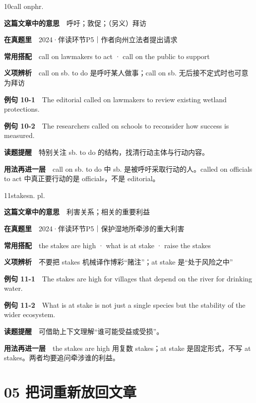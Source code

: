 \documentclass[a4paper,11pt,openany]{report}
\newcommand{\emphasislabel}[1]{\textcolor{leaf}{\CJKsf\bfseries #1}}
\begin{document}
\begin{vocabbox}{10}{call on}{phr.}

\textbf{这篇文章中的意思}　呼吁；敦促；（另义）拜访

\textbf{在真题里}　2024·伴读环节P5｜作者向州立法者提出请求

\textbf{常用搭配}　call on lawmakers to act · call on the public to support

\textbf{义项辨析}　call on sb. to do 是呼吁某人做事；call on sb. 无后接不定式时也可意为拜访

\textbf{例句 10-1}　The editorial called on lawmakers to review existing wetland protections.

\textbf{例句 10-2}　The researchers called on schools to reconsider how success is measured.

\emphasislabel{读题提醒}　特别关注 sb. to do 的结构，找清行动主体与行动内容。

\textbf{用法再进一层}　call on sb. to do 中 sb. 是被呼吁采取行动的人。called on officials to act 中真正要行动的是 officials，不是 editorial。

\end{vocabbox}

\begin{vocabbox}{11}{stakes}{n. pl.}

\textbf{这篇文章中的意思}　利害关系；相关的重要利益

\textbf{在真题里}　2024·伴读环节P5｜保护湿地所牵涉的重大利害

\textbf{常用搭配}　the stakes are high · what is at stake · raise the stakes

\textbf{义项辨析}　不要把 stakes 机械译作博彩``赌注''；at stake 是``处于风险之中''

\textbf{例句 11-1}　The stakes are high for villages that depend on the river for drinking water.

\textbf{例句 11-2}　What is at stake is not just a single species but the stability of the wider ecosystem.

\emphasislabel{读题提醒}　可借助上下文理解``谁可能受益或受损''。

\textbf{用法再进一层}　the stakes are high 用复数 stakes；at stake 是固定形式，不写 at stakes。两者均要追问牵涉谁的利益。

\end{vocabbox}

\section{05 把词重新放回文章}\label{ux628aux8bcdux91cdux65b0ux653eux56deux6587ux7ae0}
\end{document}
